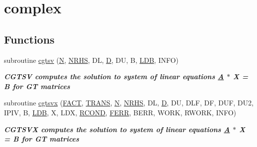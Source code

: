 \hypertarget{group__complexGTsolve}{}\section{complex}
\label{group__complexGTsolve}
\subsection*{Functions}
\begin{DoxyCompactItemize}
\item 
subroutine \hyperlink{group__complexGTsolve_ga6df7eac5a9b0c335f43c3979612f84fc}{cgtsv} (\hyperlink{polmisc_8c_a0240ac851181b84ac374872dc5434ee4}{N}, \hyperlink{example__user_8c_aa0138da002ce2a90360df2f521eb3198}{N\+R\+H\+S}, D\+L, \hyperlink{odrpack_8h_a7dae6ea403d00f3687f24a874e67d139}{D}, D\+U, B, \hyperlink{example__user_8c_a50e90a7104df172b5a89a06c47fcca04}{L\+D\+B}, I\+N\+F\+O)
\begin{DoxyCompactList}\small\item\em {\bfseries  C\+G\+T\+S\+V computes the solution to system of linear equations \hyperlink{classA}{A} $\ast$ X = B for G\+T matrices {\bfseries  }}\end{DoxyCompactList}\item 
subroutine \hyperlink{group__complexGTsolve_ga52aedc3d07eae490ca91df3dec897e8c}{cgtsvx} (\hyperlink{superlu__enum__consts_8h_af00a42ecad444bbda75cde1b64bd7e72a1b6692b56d378abb85bd49063721d034}{F\+A\+C\+T}, \hyperlink{superlu__enum__consts_8h_a0c4e17b2d5cea33f9991ccc6a6678d62a1f61e3015bfe0f0c2c3fda4c5a0cdf58}{T\+R\+A\+N\+S}, \hyperlink{polmisc_8c_a0240ac851181b84ac374872dc5434ee4}{N}, \hyperlink{example__user_8c_aa0138da002ce2a90360df2f521eb3198}{N\+R\+H\+S}, D\+L, \hyperlink{odrpack_8h_a7dae6ea403d00f3687f24a874e67d139}{D}, D\+U, D\+L\+F, D\+F, D\+U\+F, D\+U2, I\+P\+I\+V, B, \hyperlink{example__user_8c_a50e90a7104df172b5a89a06c47fcca04}{L\+D\+B}, X, L\+D\+X, \hyperlink{superlu__enum__consts_8h_af00a42ecad444bbda75cde1b64bd7e72a9b5c151728d8512307565994c89919d5}{R\+C\+O\+N\+D}, \hyperlink{superlu__enum__consts_8h_af00a42ecad444bbda75cde1b64bd7e72a78fd14d7abebae04095cfbe02928f153}{F\+E\+R\+R}, B\+E\+R\+R, W\+O\+R\+K, R\+W\+O\+R\+K, I\+N\+F\+O)
\begin{DoxyCompactList}\small\item\em {\bfseries  C\+G\+T\+S\+V\+X computes the solution to system of linear equations \hyperlink{classA}{A} $\ast$ X = B for G\+T matrices {\bfseries  }}\end{DoxyCompactList}\end{DoxyCompactItemize}


